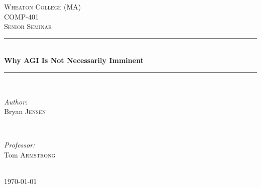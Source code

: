 \documentclass[12pt]{article} %
\begin{document}

\begin{titlepage}

\newcommand{\HRule}{\rule{\linewidth}{0.5mm}} %

\center %

\textsc{\LARGE Wheaton College (MA)}\\[1.5cm] %
\textsc{\Large COMP-401}\\[0.5cm] %
\textsc{\large Senior Seminar}\\[0.5cm] %

\HRule \\[0.4cm]
{ \huge \bfseries Why AGI Is Not Necessarily Imminent}\\[0.4cm] %
\HRule \\[1.5cm]

\begin{minipage}{0.4\textwidth}
\begin{flushleft} \large
\emph{Author:}\\
Bryan \textsc{Jensen} %
\end{flushleft}
\end{minipage}
~
\begin{minipage}{0.4\textwidth}
\begin{flushright} \large
\emph{Professor:} \\
Tom \textsc{Armstrong} %
\end{flushright}
\end{minipage}\\[4cm]

{\large \today}\\[3cm] %


\vfill %

\end{titlepage}

\end{document}
